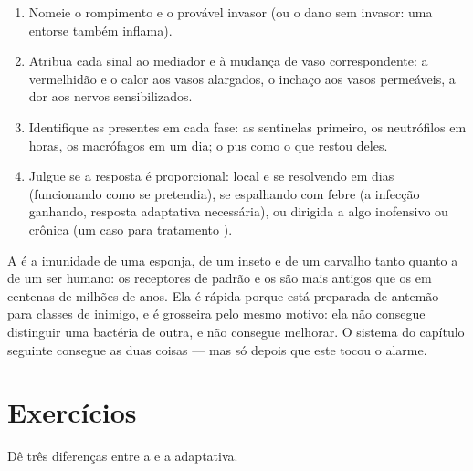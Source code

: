 \begin{method}\label{met:g12:innate-immunity:read}
\begin{enumerate}
  \item Nomeie o rompimento e o provável invasor (ou o dano sem
        invasor: uma entorse também inflama).
  \item Atribua cada sinal ao mediador e à mudança de vaso
        correspondente: a vermelhidão e o calor aos vasos alargados, o
        inchaço aos vasos permeáveis, a dor aos nervos sensibilizados.
  \item Identifique as  presentes em cada fase: as sentinelas
        primeiro, os neutrófilos em horas, os macrófagos em um dia; o
        pus como o que restou deles.
  \item Julgue se a resposta é proporcional: local e se resolvendo em
        dias (funcionando como se pretendia), se espalhando com febre
        (a infecção ganhando, resposta adaptativa necessária), ou
        dirigida a algo inofensivo ou crônica (um caso para tratamento
        ).
\end{enumerate}
\end{method}

\begin{remark}\label{rem:g12:innate-immunity:old}
A  é a imunidade de uma esponja, de um inseto e de um
carvalho tanto quanto a de um ser humano: os receptores de padrão e os
 são mais antigos que os  em centenas de milhões de
anos. Ela é rápida porque está preparada de antemão para classes de
inimigo, e é grosseira pelo mesmo motivo: ela não consegue distinguir
uma bactéria de outra, e não consegue melhorar. O sistema do capítulo
seguinte consegue as duas coisas --- mas só depois que este tocou o alarme.
\end{remark}

\section{Exercícios}

\begin{exercise}[$\star$]\label{exo:g12:innate-immunity:1}
Dê três diferenças entre a  e a adaptativa.
\end{exercise}

